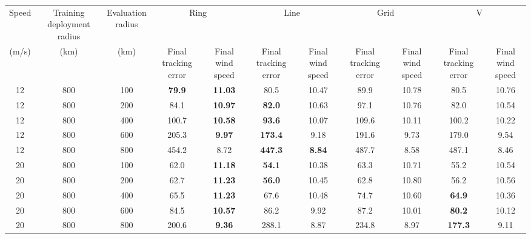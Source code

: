 \documentclass[a4paper,fleqn]{cas-dc}
\begin{document}
\centering
{}
\label{tab:formation_comparison}
\fontsize{8.6pt}{10.2pt}\selectfont
\setlength{\tabcolsep}{0.8pt}
\begin{tabular*}{\textwidth}{@{\extracolsep{\fill}}ccccccccccc@{}}
\toprule
Speed & \makecell{Training\\deployment radius} & \makecell{Evaluation\\radius} & \multicolumn{2}{c}{Ring} & \multicolumn{2}{c}{Line} & \multicolumn{2}{c}{Grid} & \multicolumn{2}{c}{V} \\
\cmidrule(lr){4-5}\cmidrule(lr){6-7}\cmidrule(lr){8-9}\cmidrule(lr){10-11}
(m/s) & (km) & (km) & \makecell{Final tracking\\error} & \makecell{Final wind\\speed} & \makecell{Final tracking\\error} & \makecell{Final wind\\speed} & \makecell{Final tracking\\error} & \makecell{Final wind\\speed} & \makecell{Final tracking\\error} & \makecell{Final wind\\speed} \\
\midrule
12 & 800 & 100 & \textbf{79.9} & \textbf{11.03} & 80.5 & 10.47 & 89.9 & 10.78 & 80.5 & 10.76 \\
12 & 800 & 200 & 84.1 & \textbf{10.97} & \textbf{82.0} & 10.63 & 97.1 & 10.76 & 82.0 & 10.54 \\
12 & 800 & 400 & 100.7 & \textbf{10.58} & \textbf{93.6} & 10.07 & 109.6 & 10.11 & 100.2 & 10.22 \\
12 & 800 & 600 & 205.3 & \textbf{9.97} & \textbf{173.4} & 9.18 & 191.6 & 9.73 & 179.0 & 9.54 \\
12 & 800 & 800 & 454.2 & 8.72 & \textbf{447.3} & \textbf{8.84} & 487.7 & 8.58 & 487.1 & 8.46 \\
\midrule
20 & 800 & 100 & 62.0 & \textbf{11.18} & \textbf{54.1} & 10.38 & 63.3 & 10.71 & 55.2 & 10.54 \\
20 & 800 & 200 & 62.7 & \textbf{11.23} & \textbf{56.0} & 10.45 & 62.8 & 10.80 & 56.2 & 10.56 \\
20 & 800 & 400 & 65.5 & \textbf{11.23} & 67.6 & 10.48 & 74.7 & 10.60 & \textbf{64.9} & 10.36 \\
20 & 800 & 600 & 84.5 & \textbf{10.57} & 86.2 & 9.92 & 87.2 & 10.01 & \textbf{80.2} & 10.12 \\
20 & 800 & 800 & 200.6 & \textbf{9.36} & 288.1 & 8.87 & 234.8 & 8.97 & \textbf{177.3} & 9.11 \\
\bottomrule
\end{tabular*}
\end{document}
